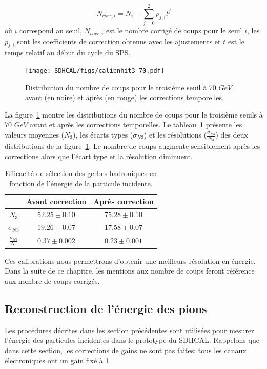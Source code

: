 \begin{equation}
  N_{corr,i}=N_i-\sum_{j=0}^{2}p_{j,i}t^j
\end{equation}
où $i$ correspond au seuil, $N_{corr,i}$ est le nombre corrigé de coups pour le seuil $i$, les $p_{j,i}$ sont les coefficients de correction obtenus avec les ajustements et $t$ est le temps relatif au début du cycle du SPS.
\begin{figure}[!ht]
  \begin{center}
    \texttt{[image: SDHCAL/figs/calibnhit3\_70.pdf]}
    \caption{Distribution du nombre de coups pour le troisième seuil à 70 $GeV$ avant (en noire) et après (en rouge) les corrections temporelles.}
    \label{fig:nhit3_corrected}
  \end{center}
\end{figure}
La figure~\ref{fig:nhit3_corrected} montre les distributions du nombre de coups pour le troisième seuils à 70 $GeV$ avant et après les corrections temporelles. Le tableau~\ref{tab.n3_comp} présente les valeurs moyennes ($\bar N_3$), les écarts types ($\sigma_{N3}$) et les résolutions ($\frac{\sigma_{N3}}{N_3}$) des deux distributions de la figure~\ref{fig:nhit3_corrected}. Le nombre de coups augmente sensiblement après les corrections alors que l'écart type et la résolution diminuent. 
\begin{table}[!ht]
  \begin{center}
    \begin{tabular}{c|c|c}
      $ $ & Avant correction & Après correction \\
      \hline
      $N_3$ & $52.25 \pm 0.10$ & $75.28 \pm 0.10$\\
      $\sigma_{N3}$ & $19.26 \pm 0.07$ & $17.58 \pm 0.07$\\
      $\frac{\sigma_{N3}}{N_3}$ & $0.37 \pm 0.002$& $0.23 \pm 0.001$\\
    \end{tabular}
  \end{center}  
  \caption{Efficacité de sélection des gerbes hadroniques en fonction de l'énergie de la particule incidente.}
  \label{tab.n3_comp}
\end{table}
Ces calibrations nous permettrons d'obtenir une meilleurs résolution en énergie. Dans la suite de ce chapitre, les mentions aux nombre de coups feront référence aux nombre de coups corrigés.

\subsection{Reconstruction de l'énergie des pions}
Les procédures décrites dans les section précédentes sont utilisées pour mesurer l’énergie des particules incidentes dans le prototype du SDHCAL. Rappelons que dans cette section, les corrections de gains ne sont pas faites: tous les canaux électroniques ont un gain fixé à 1. 
